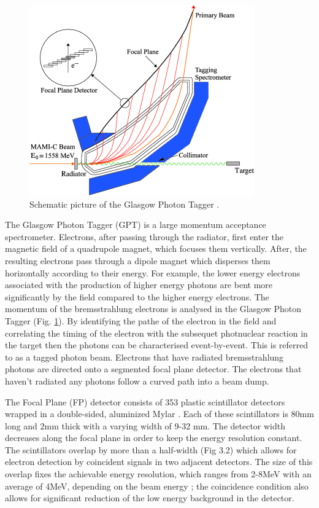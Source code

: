 \begin{figure}[H]
\begin{center}
\includegraphics[scale=0.8]{pictures/png/GlaTagger.png}
\caption{Schematic picture of the Glasgow Photon Tagger \cite{marcu}.}
\label{gpt}
\end{center}
\end{figure}

\indent The Glasgow Photon Tagger (GPT) is a large momentum acceptance spectrometer. Electrons, after passing through the radiator, first enter the magnetic field of a quadrupole magnet, which focuses them vertically. After, the resulting electrons pass through a dipole magnet which disperses them horizontally according to their energy. For example, the lower energy electrons associated with the production of higher energy photons are bent more significantly by the field compared to the higher energy electrons. The momentum of the bremsstrahlung electrons is analysed in the Glasgow Photon Tagger (Fig. \ref{gpt}). By identifying the pathe of the electron in the field and correlating the timing of the electron with the subsequet photnuclear reaction in the target then the photons can be characterised event-by-event. This is referred to as a tagged photon beam. Electrons that have radiated bremsstrahlung photons are directed onto a segmented focal plane detector. The electrons that haven't radiated any photons follow a curved path into a beam dump.

\indent The Focal Plane (FP) detector consists of 353 plastic scintillator detectors wrapped in a double-sided, aluminized Mylar \cite{sjhall}. Each of these scintillators is 80mm long and 2mm thick with a varying width of 9-32 mm. The detector width decreases along the focal plane in order to keep the energy resolution constant. The scintillators overlap by more than a half-width (Fig 3.2) which allows for electron detection by coincident signals in two adjacent detectors. The size of this overlap fixes the achievable energy resolution, which ranges from 2-8MeV with an average of 4MeV, depending on the beam energy \cite{mcgeorge}; the coincidence condition also allows for significant reduction of the low energy background in the detector.

